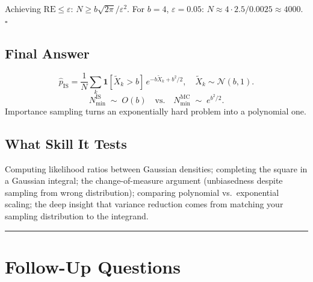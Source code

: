 \documentclass[12pt]{article}
\begin{document}
Achieving $\mathrm{RE} \leq \varepsilon$: $N \geq b\sqrt{2\pi}/\varepsilon^2$. For $b=4$, $\varepsilon=0.05$: $N \approx 4\cdot 2.5/0.0025 \approx 4000$. \quad $\square$

\subsection*{Final Answer}
\[
  \hat{p}_{\mathrm{IS}} = \frac{1}{N}\sum_k \mathbf{1}[\tilde{X}_k > b]\,e^{-b\tilde{X}_k + b^2/2},
  \quad \tilde{X}_k \sim \mathcal{N}(b,1).
\]
\[
  N^{\mathrm{IS}}_{\min} \;\sim\; O(b) \quad \text{vs.} \quad N^{\mathrm{MC}}_{\min} \;\sim\; e^{b^2/2}.
\]
Importance sampling turns an exponentially hard problem into a polynomial one.

\subsection*{What Skill It Tests}
Computing likelihood ratios between Gaussian densities; completing the square in a Gaussian integral;
the change-of-measure argument (unbiasedness despite sampling from wrong distribution);
comparing polynomial vs.\ exponential scaling; the deep insight that variance reduction comes
from matching your sampling distribution to the integrand.

\bigskip\hrule\bigskip

\section*{\textcolor{sectionblue}{Follow-Up Questions}}
\end{document}
